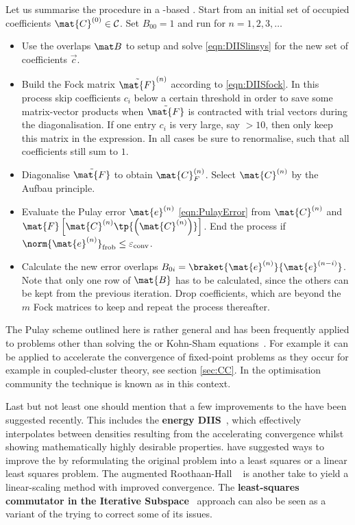 Let us summarise the procedure in a \contraction-based \SCF.
Start from an initial set of occupied coefficients $\mat{C}^{(0)} \in \mathcal{C}$.
Set $B_{00} = 1$ and run for $n=1, 2, 3, \ldots$
\begin{itemize}
	\item Use the overlaps $\mat B$ to setup and solve \eqref{eqn:DIISlinsys}
		for the new set of \DIIS coefficients $\vec{c}$.
	\item Build the Fock matrix $\tilde{\mat{F}}^{(n)}$
		according to \eqref{eqn:DIISfock}.
		In this process skip coefficients $c_i$ below a certain threshold
		in order to save some matrix-vector products when
		$\tilde{\mat{F}}$ is contracted with trial vectors during
		the diagonalisation.
		If one entry $c_i$ is very large, say $>10$,
		then only keep this matrix in the expression.
		In all cases be sure to renormalise,
		such that all coefficients still sum to $1$.
	\item Diagonalise $\tilde{\mat{F}}$
		to obtain $\mat{C}_F^{(n)}$.
		Select $\mat{C}^{(n)}$ by the Aufbau principle.
	\item Evaluate the Pulay error $\mat{e}^{(n)}$ \eqref{eqn:PulayError}
		from $\mat{C}^{(n)}$ and
		$\mat{F}\left[\mat{C}^{(n)} \tp{\left(\mat{C}^{(n)}\right)} \right]$.
		End the process if $\norm{\mat{e}^{(n)}}_\text{frob} \leq \epsilonconv$.
	\item Calculate the new error overlaps
		$B_{0i} = \braket{\mat{e}^{(n)}}{\mat{e}^{(n-i)}}$.
		Note that only one row of $\mat{B}$ has to be calculated,
		since the others can be kept from the previous \SCF iteration.
		Drop coefficients, which are beyond the $m$ Fock matrices to keep
		and repeat the process thereafter.
\end{itemize}
The Pulay \DIIS scheme outlined here is rather general
and has been frequently applied to problems
other than solving the \HF or Kohn-Sham equations~\cite{Hamilton1986}.
For example it can be applied to accelerate
the convergence of fixed-point problems
as they occur for example in coupled-cluster theory,
see section \vref{sec:CC}.
In the optimisation community the \DIIS technique is known as
 in this context.

Last but not least one should mention that a few
improvements to the \DIIS have been suggested recently.
This includes the \textbf{energy DIIS}~\cite{Kudin2002},
which effectively interpolates between densities resulting
from the \ODA accelerating \ODA convergence
whilst showing mathematically highly desirable properties.
\citet{Shepard2007} have suggested ways to improve the \DIIS
by reformulating the original problem into a least squares
or a linear least squares problem.
The augmented Roothaan-Hall \DIIS~\cite{Hoest2008} is another take
to yield a linear-scaling method with improved convergence.
The
\textbf{least-squares commutator in the Iterative Subspace}~\cite{Li2016} approach
can also be seen as a variant of the \DIIS
trying to correct some of its issues.

